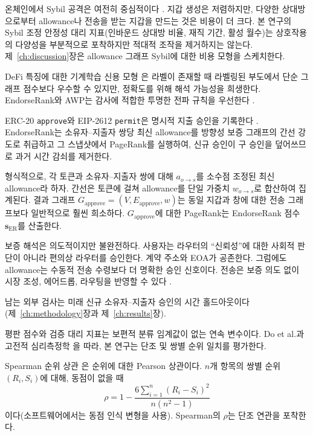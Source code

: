 온체인에서 Sybil 공격은 여전히 중심적이다 . 지갑 생성은 저렴하지만, 다양한 상대방으로부터 allowance나 전송을 받는 지갑을 만드는 것은 비용이 더 크다. 본 연구의 Sybil 조정 안정성 대리 지표(인바운드 상대방 비율, 재직 기간, 활성 월수)는 상호작용의 다양성을 부분적으로 포착하지만 적대적 조작을 제거하지는 않는다. 제~\ref{ch:discussion}장은 allowance 그래프 Sybil에 대한 비용 모형을 스케치한다.

DeFi 특징에 대한 기계학습 신용 모형 은 라벨이 존재할 때 라벨링된 부도에서 단순 그래프 점수보다 우수할 수 있지만, 정확도를 위해 해석 가능성을 희생한다. EndorseRank와 AWP는 감사에 적합한 투명한 전파 규칙을 우선한다 .


ERC-20 \texttt{approve}와 EIP-2612 \texttt{permit}은 명시적 지출 승인을 기록한다 . EndorseRank는 소유자--지출자 쌍당 최신 allowance를 방향성 보증 그래프의 간선 강도로 취급하고 그 스냅샷에서 PageRank를 실행하여, 신규 승인이 구 승인을 덮어쓰므로 과거 시간 감쇠를 제거한다.

형식적으로, 각 토큰과 소유자--지출자 쌍에 대해 $a_{o\to s}$를 소수점 조정된 최신 allowance라 하자. 간선은 토큰에 걸쳐 allowance를 단일 가중치 $w_{o\to s}$로 합산하여 집계된다. 결과 그래프 $G_{\text{approve}}=(V,E_{\text{approve}},w)$는 동일 지갑과 창에 대한 전송 그래프보다 일반적으로 훨씬 희소하다. $G_{\text{approve}}$에 대한 PageRank는 EndorseRank 점수 $\mathbf{s}_{\mathrm{ER}}$를 산출한다.

보증 해석은 의도적이지만 불완전하다. 사용자는 라우터의 ``신뢰성''에 대한 사회적 판단이 아니라 편의상 라우터를 승인한다. 계약 주소와 EOA가 공존한다. 그럼에도 allowance는 수동적 전송 수령보다 더 명확한 승인 신호이다. 전송은 보증 의도 없이 시장 조성, 에어드롭, 라우팅을 반영할 수 있다 .


남는 외부 검사는 미래 신규 소유자--지출자 승인의 시간 홀드아웃이다(제~\ref{ch:methodology}장과 제~\ref{ch:results}장).


평판 점수와 검증 대리 지표는 보편적 분류 임계값이 없는 연속 변수이다. Do et al.과 고전적 심리측정학 을 따라, 본 연구는 단조 및 쌍별 순위 일치를 평가한다.

Spearman 순위 상관 은 순위에 대한 Pearson 상관이다. $n$개 항목의 쌍별 순위 $(R_i,S_i)$에 대해, 동점이 없을 때
\begin{equation}
\rho = 1 - \frac{6\sum_{i=1}^n (R_i-S_i)^2}{n(n^2-1)}
\label{eq:spearman}
\end{equation}
이다(소프트웨어에서는 동점 인식 변형을 사용). Spearman의 $\rho$는 단조 연관을 포착한다.

